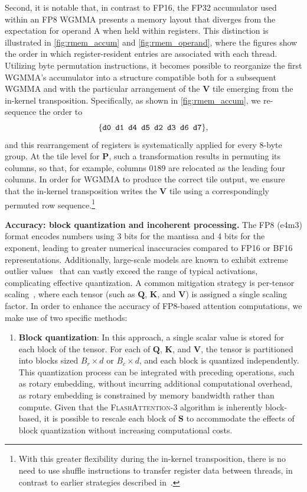 \begin{algorithm}[H]
\begin{algorithmic}[1]
Second, it is notable that, in contrast to FP16, the FP32 accumulator used within an FP8 WGMMA presents a memory layout that diverges from the expectation for operand A when held within registers. This distinction is illustrated in \cref{fig:rmem_accum} and \cref{fig:rmem_operand}, where the figures show the order in which register-resident entries are associated with each thread. Utilizing byte permutation instructions, it becomes possible to reorganize the first WGMMA's accumulator into a structure compatible both for a subsequent WGMMA and with the particular arrangement of the $\mathbf{V}$ tile emerging from the in-kernel transposition. Specifically, as shown in \cref{fig:rmem_accum}, we re-sequence the order to
$$\{ \verb|d0 d1 d4 d5 d2 d3 d6 d7| \},$$
and this rearrangement of registers is systematically applied for every 8-byte group. At the tile level for $\mathbf{P}$, such a transformation results in permuting its columns, so that, for example, columns $0189$ are relocated as the leading four columns. In order for WGMMA to produce the correct tile output, we ensure that the in-kernel transposition writes the $\mathbf{V}$ tile using a correspondingly permuted row sequence.\footnote{With this greater flexibility during the in-kernel transposition, there is no need to use shuffle instructions to transfer register data between threads, in contrast to earlier strategies described in~\citep{colfax_fp8_flashattention_2024}.}

\textbf{Accuracy: block quantization and incoherent processing.} The FP8 (e4m3) format encodes numbers using 3 bits for the mantissa and 4 bits for the exponent, leading to greater numerical inaccuracies compared to FP16 or BF16 representations. Additionally, large-scale models are known to exhibit extreme outlier values~\citep{dettmers2208llm, sun2024massive} that can vastly exceed the range of typical activations, complicating effective quantization. A common mitigation strategy is per-tensor scaling~\citep{micikevicius2022fp8}, where each tensor (such as $\mathbf{Q}$, $\mathbf{K}$, and $\mathbf{V}$) is assigned a single scaling factor. In order to enhance the accuracy of FP8-based attention computations, we make use of two specific methods:

\begin{enumerate}

\item \textbf{Block quantization}: In this approach, a single scalar value is stored for each block of the tensor. For each of $\mathbf{Q}$, $\mathbf{K}$, and $\mathbf{V}$, the tensor is partitioned into blocks sized $B_r \times d$ or $B_c \times d$, and each block is quantized independently. This quantization process can be integrated with preceding operations, such as rotary embedding, without incurring additional computational overhead, as rotary embedding is constrained by memory bandwidth rather than compute. Given that the \textsc{FlashAttention-3} algorithm is inherently block-based, it is possible to rescale each block of $\mathbf{S}$ to accommodate the effects of block quantization without increasing computational costs.


\end{enumerate}
\end{algorithmic}
\end{algorithm}
